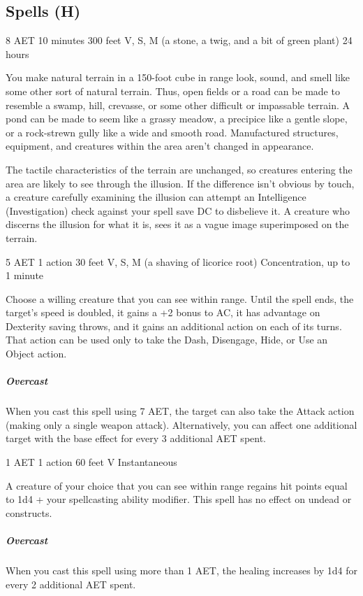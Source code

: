 \subsection{Spells (H)}
\label{spell:hallucinatory-terrain}
{8 AET}
{10 minutes}
{300 feet}
{V, S, M (a stone, a twig, and a bit of green plant)}
{24 hours}

You make natural terrain in a 150-foot cube in range look, sound, and smell like some other sort of natural terrain. Thus, open fields or a road can be made to resemble a swamp, hill, crevasse, or some other difficult or impassable terrain. A pond can be made to seem like a grassy meadow, a precipice like a gentle slope, or a rock-strewn gully like a wide and smooth road. Manufactured structures, equipment, and creatures within the area aren't changed in appearance.

The tactile characteristics of the terrain are unchanged, so creatures entering the area are likely to see through the illusion. If the difference isn't obvious by touch, a creature carefully examining the illusion can attempt an Intelligence (Investigation) check against your spell save DC to disbelieve it. A creature who discerns the illusion for what it is, sees it as a vague image superimposed on the terrain.

\label{spell:haste}
{5 AET}
{1 action}
{30 feet}
{V, S, M (a shaving of licorice root)}
{Concentration, up to 1 minute}

Choose a willing creature that you can see within range. Until the spell ends, the target's speed is doubled, it gains a +2 bonus to AC, it has advantage on Dexterity saving throws, and it gains an additional action on each of its turns. That action can be used only to take the Dash, Disengage, Hide, or Use an Object action.

\subparagraph*{Overcast} When you cast this spell using 7 AET, the target can also take the Attack action (making only a single weapon attack). Alternatively, you can affect one additional target with the base effect for every 3 additional AET spent.

\label{spell:healing-word}
{1 AET}
{1 action}
{60 feet}
{V}
{Instantaneous}

A creature of your choice that you can see within range regains hit points equal to 1d4 + your spellcasting ability modifier. This spell has no effect on undead or constructs.
\subparagraph*{Overcast} When you cast this spell using more than 1 AET, the healing increases by 1d4 for every 2 additional AET spent.

